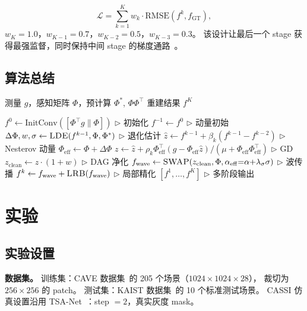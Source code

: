 \documentclass[a4paper,11pt,twocolumn]{ctexart}
\newcommand{\smiletwo}{SMILE\textsuperscript{2}}
\newcommand{\swap}{\textsc{SWAP}}
\newcommand{\lde}{\textsc{LDE}}
\newcommand{\lrb}{\textsc{LRB}}
\newcommand{\PhiEff}{\Phi_{\mathrm{eff}}}
\newcommand{\alphaEff}{\alpha_{\mathrm{eff}}}
\begin{document}
\begin{equation}
\mathcal{L} = \sum_{k=1}^{K} w_k \cdot \text{RMSE}(f^k, f_{\mathrm{GT}}),
\label{eq:loss}
\end{equation}
$w_K = 1.0$，$w_{K-1} = 0.7$，$w_{K-2} = 0.5$，$w_{K-3} = 0.3$。
该设计让最后一个 stage 获得最强监督，同时保持中间 stage 的梯度通路~\citep{zhang2024dpu}。


\subsection{算法总结}

\begin{algorithm}[t]
\caption{\smiletwo{} 单次前向传播}
\label{alg:smile2}
\begin{algorithmic}[1]
\REQUIRE 测量 $g$，感知矩阵 $\Phi$，预计算 $\Phi^*$, $\Phi\Phi^\top$
\ENSURE 重建结果 $f^K$

\STATE $f^0 \gets \text{InitConv}([\Phi^\top g \| \Phi])$ \hfill $\triangleright$ 初始化
\STATE $f^{-1} \gets f^0$ \hfill $\triangleright$ 动量初始
    \STATE $\Delta\Phi, w, \sigma \gets \lde{}(f^{k-1}, \Phi, \Phi^*)$ \hfill $\triangleright$ 退化估计
    \STATE $\hat{z} \gets f^{k-1} + \beta_k(f^{k-1} - f^{k-2})$ \hfill $\triangleright$ Nesterov 动量
    \STATE $\PhiEff \gets \Phi + \Delta\Phi$
    \STATE $z \gets \hat{z} + \rho_k \PhiEff^\top (g - \PhiEff \hat{z}) / (\mu + \PhiEff\PhiEff^\top)$ \hfill $\triangleright$ GD
    \STATE $z_{\mathrm{clean}} \gets z \cdot (1 + w)$ \hfill $\triangleright$ DAG 净化
    \STATE $f_{\mathrm{wave}} \gets \swap{}(z_{\mathrm{clean}}, \Phi, \alphaEff{=}\alpha{+}\lambda_\sigma\sigma)$ \hfill $\triangleright$ 波传播
    \STATE $f^k \gets f_{\mathrm{wave}} + \lrb{}(f_{\mathrm{wave}})$ \hfill $\triangleright$ 局部精化
\ENDFOR
\RETURN $[f^1, \ldots, f^K]$ \hfill $\triangleright$ 多阶段输出
\end{algorithmic}
\end{algorithm}


\section{实验}\label{sec:exp}

\subsection{实验设置}

\textbf{数据集。}
训练集：CAVE 数据集~\citep{yasuma2010cave}的 205 个场景（$1024 \times 1024 \times 28$），
裁切为 $256 \times 256$ 的 patch。
测试集：KAIST 数据集~\citep{choi2017kaist}的 10 个标准测试场景。
CASSI 仿真设置沿用 TSA-Net~\citep{meng2020tsanet}：step $= 2$，真实灰度 mask。
\end{document}
